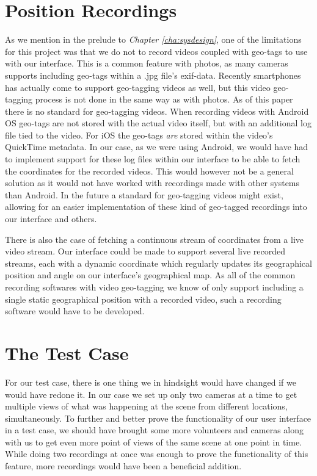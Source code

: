 \section{Position Recordings}
\label{sec:positionrecordings}
As we mention in the prelude to \textit{Chapter \ref{cha:sysdesign}}, one of the limitations for this project was that we do not to record videos coupled with geo-tags to use with our interface. This is a common feature with photos, as many cameras supports including geo-tags within a .jpg file's exif-data. Recently smartphones has actually come to support geo-tagging videos as well, but this video geo-tagging process is not done in the same way as with photos. As of this paper there is no standard for geo-tagging videos. When recording videos with Android OS geo-tags are not stored with the actual video itself, but with an additional log file tied to the video. For iOS the geo-tags \textit{are} stored within the video's QuickTime metadata. In our case, as we were using Android, we would have had to implement support for these log files within our interface to be able to fetch the coordinates for the recorded videos. This would however not be a general solution as it would not have worked with recordings made with other systems than Android. In the future a standard for geo-tagging videos might exist, allowing for an easier implementation of these kind of geo-tagged recordings into our interface and others. 

There is also the case of fetching a continuous stream of coordinates from a live video stream. Our interface could be made to support several live recorded streams, each with a dynamic coordinate which regularly updates its geographical position and angle on our interface's geographical map. As all of the common recording softwares with video geo-tagging we know of only support including a single static geographical position with a recorded video, such a recording software would have to be developed.

\section{The Test Case}
\label{sec:test case} 
For our test case, there is one thing we in hindsight would have changed if we would have redone it. In our case we set up only two cameras at a time to get multiple views of what was happening at the scene from different locations, simultaneously. To further and better prove the functionality of our user interface in a test case, we should have brought some more volunteers and cameras along with us to get even more point of views of the same scene at one point in time. While doing two recordings at once was enough to prove the functionality of this feature, more recordings would have been a beneficial addition. 

